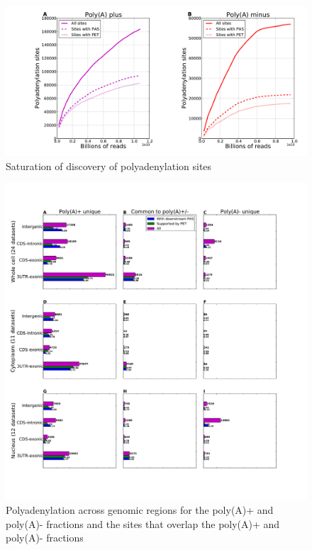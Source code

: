 \begin{figure}[htb]
	\begin{center}
		\includegraphics[scale=0.3]{figures/polyadenylation/Saturation_plot_2+.pdf}
	\end{center}
	\caption{Saturation of discovery of polyadenylation sites}
	\label{fig:saturation}
\end{figure}

\begin{figure}[htb]
	\begin{center}
		\includegraphics[scale=0.3]{figures/polyadenylation/intersected_sidebars_pA_2+.pdf}
	\end{center}
	\caption{Polyadenylation across genomic regions for the poly(A)+ and poly(A)-
	fractions and the sites that overlap the poly(A)+ and poly(A)- fractions}
	\label{fig:sidebars_intersect}
\end{figure}

